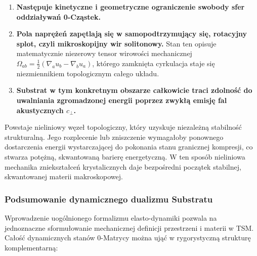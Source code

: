 \documentclass[
  polish,
  letterpaper,
  DIV=11,
  numbers=noendperiod,
  oneside]{scrartcl}
\providecommand{\tightlist}{%
  \setlength{\itemsep}{0pt}\setlength{\parskip}{0pt}}
\begin{document}
\begin{enumerate}
\def\labelenumi{\arabic{enumi}.}
\tightlist
\item
  \textbf{Następuje kinetyczne i geometryczne ograniczenie swobody sfer
  oddziaływań 0-Cząstek.}
\item
  \textbf{Pola naprężeń zapętlają się w samopodtrzymujący się, rotacyjny
  splot, czyli mikroskopijny wir solitonowy.} Stan ten opisuje
  matematycznie niezerowy tensor wirowości mechanicznej
  \(\Omega_{ab} = \frac{1}{2}(\nabla_a u_b - \nabla_b u_a)\), którego
  zamknięta cyrkulacja staje się niezmiennikiem topologicznym całego
  układu.
\item
  \textbf{Substrat w tym konkretnym obszarze całkowicie traci zdolność
  do uwalniania zgromadzonej energii poprzez zwykłą emisję fal
  akustycznych \(c_{\perp}\).}
\end{enumerate}

Powstaje nieliniowy węzeł topologiczny, który uzyskuje niezależną
stabilność strukturalną. Jego rozplecenie lub zniszczenie wymagałoby
ponownego dostarczenia energii wystarczającej do pokonania stanu
granicznej kompresji, co stwarza potężną, skwantowaną barierę
energetyczną. W ten sposób nieliniowa mechanika zniekształceń
krystalicznych daje bezpośredni początek stabilnej, skwantowanej materii
makroskopowej.

\subsubsection{Podsumowanie dynamicznego dualizmu
Substratu}\label{sec-1-5-3}

Wprowadzenie uogólnionego formalizmu elasto-dynamiki pozwala na
jednoznaczne sformułowanie mechanicznej definicji przestrzeni i materii
w TSM. Całość dynamicznych stanów 0-Matrycy można ująć w rygorystyczną
strukturę komplementarną:
\end{document}
